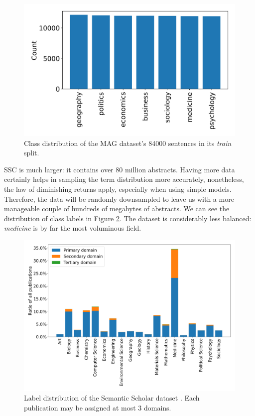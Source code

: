 \begin{figure}
    \centering
    \includegraphics[width=0.5\linewidth]{figures/mag-distribution.png}
    \captionsetup{width=.9\linewidth}
    \caption{Class distribution of the MAG  \cite{wang2019review} dataset's 84000 sentences in its \textit{train} split.}
    \label{fig:mag-distribtion}
\end{figure}

SSC is much larger: it contains over 80 million abstracts. Having more data certainly helps in sampling the term distribution more accurately, nonetheless, the law of diminishing returns apply, especially when using simple models. Therefore, the data will be randomly downsampled to leave us with a more manageable couple of hundreds of megabytes of abstracts. We can see the distribution of class labels in Figure \ref{fig:ss-distribution}. The dataset is considerably less balanced: \textit{medicine} is by far the most voluminous field.

\begin{figure}
    \centering
    \includegraphics[width=0.8\linewidth]{figures/ss-distribution.png}
    \captionsetup{width=.9\linewidth}
    \caption{Label distribution of the Semantic Scholar dataset \cite{Lo2020S2ORCTS}. Each publication may be assigned at most 3 domains.}
    \label{fig:ss-distribution}
\end{figure}


